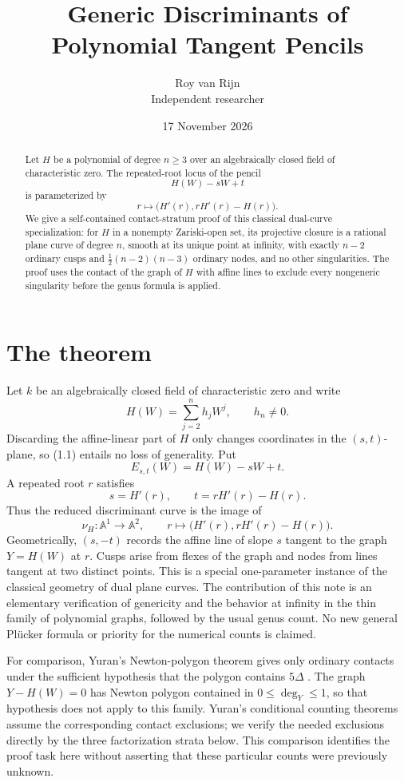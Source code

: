 \documentclass[11pt]{article}
\title{Generic Discriminants of Polynomial Tangent Pencils}
\author{Roy van Rijn\\{\small Independent researcher}}
\date{17 November 2026}
\newcommand{\A}{\mathbb A}
\begin{document}
\maketitle

\begin{abstract}
Let \(H\) be a polynomial of degree \(n\geq3\) over an algebraically
closed field of characteristic zero.  The repeated-root locus of the pencil
\[
  H(W)-sW+t
\]
is parameterized by
\[
  r\longmapsto\bigl(H'(r),rH'(r)-H(r)\bigr).
\]
We give a self-contained contact-stratum proof of this classical dual-curve
specialization: for \(H\) in a nonempty Zariski-open set, its projective
closure is a rational plane curve of degree \(n\), smooth at its unique
point at infinity, with exactly \(n-2\) ordinary cusps and
\(\frac12(n-2)(n-3)\) ordinary nodes, and no other singularities.
The proof uses the contact of the graph of \(H\) with affine lines to
exclude every nongeneric singularity before the genus formula is applied.
\end{abstract}

\section{The theorem}

Let \(k\) be an algebraically closed field of characteristic zero and write
\[
  H(W)=\sum_{j=2}^{n}h_jW^j,\qquad h_n\neq0.              \tag{1.1}
\]
Discarding the affine-linear part of \(H\) only changes coordinates in the
\((s,t)\)-plane, so (1.1) entails no loss of generality.  Put
\[
  E_{s,t}(W)=H(W)-sW+t.
\]
A repeated root \(r\) satisfies
\[
  s=H'(r),\qquad t=rH'(r)-H(r).                           \tag{1.2}
\]
Thus the reduced discriminant curve is the image of
\[
  \nu_H:\A^1\longrightarrow\A^2,\qquad
  r\longmapsto\bigl(H'(r),rH'(r)-H(r)\bigr).              \tag{1.3}
\]
Geometrically, \((s,-t)\) records the affine line of slope \(s\) tangent to
the graph \(Y=H(W)\) at \(r\).  Cusps arise from flexes of the graph and
nodes from lines tangent at two distinct points.  This is a special
one-parameter instance of the classical geometry of dual plane
curves.  The contribution of this note is an elementary verification of
genericity and the behavior at infinity in the thin family of polynomial
graphs, followed by the usual genus count.  No new general Pl\"ucker formula
or priority for the numerical counts is claimed.

For comparison, Yuran's Newton-polygon theorem gives only ordinary contacts
under the sufficient hypothesis that the polygon contains \(5\Delta\)
\cite[Theorems~1.3 and~1.16]{Yuran}.  The graph \(Y-H(W)=0\) has Newton
polygon contained in \(0\leq\deg_Y\leq1\), so that hypothesis does not
apply to this family.  Yuran's conditional counting theorems assume the
corresponding contact exclusions; we verify the needed exclusions directly
by the three factorization strata below.  This comparison identifies the
proof task here without asserting that these particular counts were
previously unknown.
\end{document}
